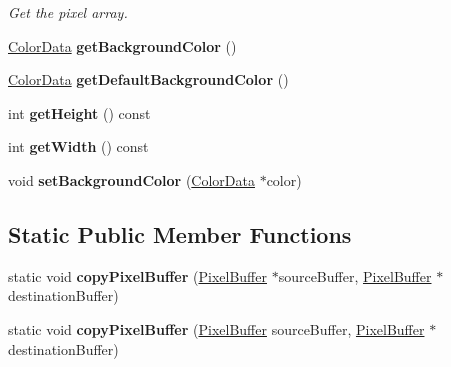 \begin{DoxyCompactItemize}
\begin{DoxyCompactList}\small\item\em Get the pixel array. \end{DoxyCompactList}\item 
\hyperlink{classColorData}{Color\+Data} {\bfseries get\+Background\+Color} ()\hypertarget{classPixelBuffer_a7eadc0d458fec5d0e0f502d279b86ea7}{}\label{classPixelBuffer_a7eadc0d458fec5d0e0f502d279b86ea7}

\item 
\hyperlink{classColorData}{Color\+Data} {\bfseries get\+Default\+Background\+Color} ()\hypertarget{classPixelBuffer_a36649accdea429915280ba71a7976300}{}\label{classPixelBuffer_a36649accdea429915280ba71a7976300}

\item 
int {\bfseries get\+Height} () const \hypertarget{classPixelBuffer_abd5685a6a23041ed9640da9370eb7839}{}\label{classPixelBuffer_abd5685a6a23041ed9640da9370eb7839}

\item 
int {\bfseries get\+Width} () const \hypertarget{classPixelBuffer_a26dc9286596d27cd416d34611c00602e}{}\label{classPixelBuffer_a26dc9286596d27cd416d34611c00602e}

\item 
void {\bfseries set\+Background\+Color} (\hyperlink{classColorData}{Color\+Data} $\ast$color)\hypertarget{classPixelBuffer_a1838bd976c9c98a79b0c2eb1246b816f}{}\label{classPixelBuffer_a1838bd976c9c98a79b0c2eb1246b816f}

\end{DoxyCompactItemize}
\subsection*{Static Public Member Functions}
\begin{DoxyCompactItemize}
\item 
static void {\bfseries copy\+Pixel\+Buffer} (\hyperlink{classPixelBuffer}{Pixel\+Buffer} $\ast$source\+Buffer, \hyperlink{classPixelBuffer}{Pixel\+Buffer} $\ast$destination\+Buffer)\hypertarget{classPixelBuffer_afedcf4028903278e8eacbd78d11232ee}{}\label{classPixelBuffer_afedcf4028903278e8eacbd78d11232ee}

\item 
static void {\bfseries copy\+Pixel\+Buffer} (\hyperlink{classPixelBuffer}{Pixel\+Buffer} source\+Buffer, \hyperlink{classPixelBuffer}{Pixel\+Buffer} $\ast$destination\+Buffer)\hypertarget{classPixelBuffer_a91bfa4c461b467c0504601a7bc6e29b2}{}\label{classPixelBuffer_a91bfa4c461b467c0504601a7bc6e29b2}

\end{DoxyCompactItemize}
